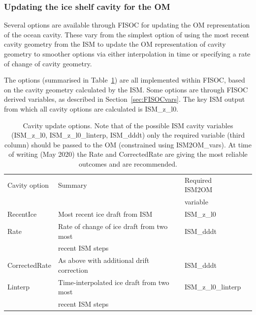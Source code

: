 \documentclass[11pt]{article}
\begin{document}
\subsubsection{Updating the ice shelf cavity for the OM}

Several options are available through FISOC for updating the OM representation 
of the ocean cavity. 
These vary from the simplest option of using 
the most recent cavity geometry from the ISM to update the OM representation of 
cavity geometry to smoother options via either interpolation in time or 
specifying a rate of change of cavity geometry.

The options (summarised in Table~\ref{tab:cavity}) are all implemented 
within FISOC, based on the cavity geometry 
calculated by the ISM.  
Some options are through FISOC derived variables, as described 
in Section~\ref{sec:FISOCvars}.  
The key ISM output from which all cavity options 
are calculated is ISM\_z\_l0.  

\begin{table}
  \begin{center}
    \begin{tabular}{ llll }
      Cavity option  & Summary                                    & Required ISM2OM \\
                     &                                            &  variable       \\
      \hline
      RecentIce      & Most recent ice draft from ISM             & ISM\_z\_l0      \\
      Rate           & Rate of change of ice draft from two most  & ISM\_dddt       \\
                     & recent ISM steps                           &                 \\
      CorrectedRate  & As above with additional drift correction  & ISM\_dddt       \\
      Linterp        & Time-interpolated ice draft from two most  & ISM\_z\_l0\_linterp \\
                     &  recent ISM steps                          &                  \\
    \end{tabular}
  \end{center}
  \caption{
    Cavity update options.  Note that of the possible ISM cavity variables 
    (ISM\_z\_l0, ISM\_z\_l0\_linterp, ISM\_dddt) only the required variable 
    (third column) should be passed to the OM (constrained using ISM2OM\_vars).
    At time of writing (May 2020) the Rate and CorrectedRate are giving 
    the most reliable outcomes and are recommended.
  }
  \label{tab:cavity}
\end{table}
\end{document}
